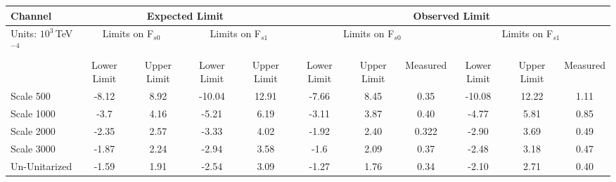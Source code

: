  \begin{tabular}{  | l | c c | c c | c c c | c c c | }
      \hline
      Channel & \multicolumn{4}{c|}{Expected Limit} &\multicolumn{6}{c|}{Observed Limit} \\\hline 
      Units: $10^3\,$TeV$^{-4}$& \multicolumn{2}{c|}{Limits on F$_{s0}$} & \multicolumn{2}{c|}{Limits on F$_{s1}$} & \multicolumn{3}{c|}{Limits on F$_{s0}$} & \multicolumn{3}{c|}{Limits on F$_{s1}$}  \\\hline
      & Lower Limit & Upper Limit & Lower Limit & Upper Limit & Lower Limit & Upper Limit & Measured & Lower Limit & Upper Limit & Measured  \\\hline
      Scale 500  & -8.12 & 8.92 & -10.04 & 12.91 & -7.66 & 8.45 & 0.35  & -10.08 & 12.22 & 1.11 \\\hline
      Scale 1000 & -3.7 & 4.16 & -5.21 & 6.19 & -3.11 & 3.87 & 0.40 & -4.77 & 5.81 & 0.85  \\\hline
      Scale 2000 & -2.35 & 2.57 & -3.33 & 4.02 & -1.92 & 2.40 & 0.322  & -2.90 & 3.69 & 0.49 \\\hline
      Scale 3000 & -1.87 & 2.24 & -2.94 & 3.58 & -1.6 & 2.09 & 0.37 & -2.48 & 3.18 & 0.47  \\\hline
      Un-Unitarized & -1.59 & 1.91 & -2.54 & 3.09  & -1.27 & 1.76  & 0.34 & -2.10 & 2.71  & 0.40 \\\hline
\end{tabular}


